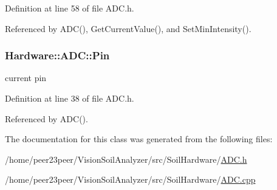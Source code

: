 Definition at line 58 of file A\+D\+C.\+h.



Referenced by A\+D\+C(), Get\+Current\+Value(), and Set\+Min\+Intensity().

\hypertarget{class_hardware_1_1_a_d_c_acb6d23369c7047296af402ca480bb2f5}{}
\subsubsection[{Pin}]{ Hardware\+::\+A\+D\+C\+::\+Pin}\label{class_hardware_1_1_a_d_c_acb6d23369c7047296af402ca480bb2f5}
current pin 

Definition at line 38 of file A\+D\+C.\+h.



Referenced by A\+D\+C().



The documentation for this class was generated from the following files\+:\begin{DoxyCompactItemize}
\item 
/home/peer23peer/\+Vision\+Soil\+Analyzer/src/\+Soil\+Hardware/\hyperlink{_a_d_c_8h}{A\+D\+C.\+h}\item 
/home/peer23peer/\+Vision\+Soil\+Analyzer/src/\+Soil\+Hardware/\hyperlink{_a_d_c_8cpp}{A\+D\+C.\+cpp}\end{DoxyCompactItemize}
